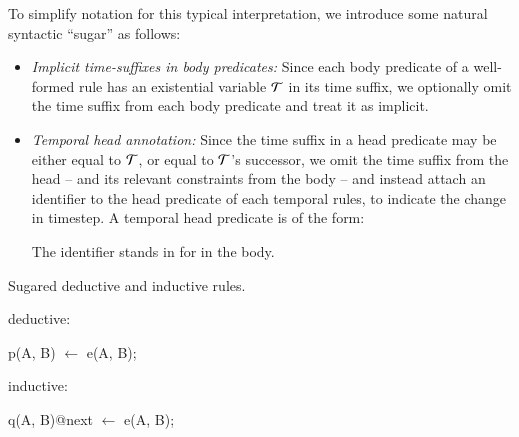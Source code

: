 To simplify \slang notation for this typical interpretation,  we introduce
some natural syntactic ``sugar'' as follows:

\begin{itemize}
%
%
\item {\em Implicit time-suffixes in body predicates:} Since each body
predicate of a well-formed rule has an existential variable $\Tau$ in its
time suffix, we optionally omit the time suffix from each body predicate and treat
it as implicit.
%
\item {\em Temporal head annotation:} Since the time suffix in a head predicate
may be either equal to $\Tau$, or equal to $\Tau$'s successor, we omit the time
suffix from the head -- and its relevant constraints from the body -- and
instead attach an identifier to the head predicate of each temporal rules, to indicate the change in
timestep.  A temporal head predicate is of the form:


The identifier  stands in for  in
the body.

%
%
%
%
%
\end{itemize}


\begin{example}
Sugared deductive and inductive rules.

deductive:\\
\begin{Dedalus}
p(A, B) \(\leftarrow\) e(A, B);
\end{Dedalus}
inductive:\\
\begin{Dedalus}
q(A, B)@next \(\leftarrow\) e(A, B);
\end{Dedalus}
\end{example}


